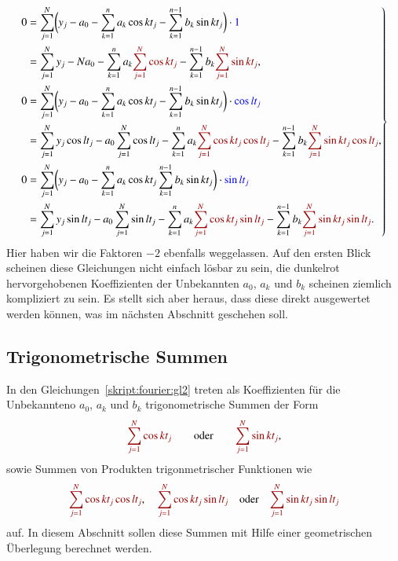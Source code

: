 \begin{equation}
\left.
\begin{aligned}
0&=
\sum_{j=1}^N
\biggl(
y_j - a_0 - \sum_{k=1}^n a_k\cos kt_j - \sum_{k=1}^{n-1} b_k\sin kt_j
\biggr)\cdot\mathstrut{\color{blue}1}
\\
&=
\sum_{j=1}^N y_j
-Na_0
-\sum_{k=1}^n a_k {\color{darkred}\sum_{j=1}^N\cos kt_j}
-\sum_{k=1}^{n-1} b_k {\color{darkred}\sum_{j=1}^N\sin kt_j},
\\
0&=
\sum_{j=1}^N
\biggl(
y_j - a_0 - \sum_{k=1}^n a_k\cos kt_j - \sum_{k=1}^{n-1} b_k\sin kt_j
\biggr)\cdot\mathstrut {\color{blue}\cos lt_j}
\\
&=
\sum_{j=1}^N y_j \cos lt_j
-a_0\sum_{j=1}^N \cos lt_j
-\sum_{k=1}^n a_k {\color{darkred}\sum_{j=1}^N\cos kt_j\cos lt_j}
-\sum_{k=1}^{n-1} b_k {\color{darkred}\sum_{j=1}^N\sin kt_j\cos lt_j},
\\
0
&=
\sum_{j=1}^N
\biggl(
y_j - a_0 - \sum_{k=1}^n a_k\cos kt_j \sum_{k=1}^{n-1} b_k\sin kt_j
\biggr)\cdot\mathstrut {\color{blue}\sin lt_j}
\\
&=
\sum_{j=1}^N y_j \sin lt_j
-a_0\sum_{j=1}^N \sin lt_j
-\sum_{k=1}^n a_k {\color{darkred}\sum_{j=1}^N\cos kt_j\sin lt_j}
-\sum_{k=1}^{n-1} b_k {\color{darkred}\sum_{j=1}^N\sin kt_j\sin lt_j}.
\end{aligned}
\right\}
\label{skript:fourier:gl2}
\end{equation}
Hier haben wir die Faktoren $-2$ ebenfalls weggelassen.
Auf den ersten Blick scheinen diese Gleichungen nicht einfach lösbar zu
sein, die {\color{darkred}dunkelrot} hervorgehobenen Koeffizienten der
Unbekannten $a_0$, $a_k$ und $b_k$ scheinen ziemlich kompliziert zu sein.
Es stellt sich aber heraus, dass diese direkt ausgewertet werden können,
was im nächsten Abschnitt geschehen soll.

\subsection{Trigonometrische Summen}
In den Gleichungen~\eqref{skript:fourier:gl2} treten als Koeffizienten
für die Unbekannteno $a_0$, $a_k$ und $b_k$ trigonometrische Summen
der Form
\begin{equation}
{\color{darkred}
\sum_{j=1}^N \cos kt_j}
\qquad
\text{oder}
\qquad
{\color{darkred}
\sum_{j=1}^N \sin kt_j},
\label{skript:fourier:trigosum}
\end{equation}
sowie Summen von Produkten trigonmetrischer Funktionen wie
\begin{equation}
{\color{darkred}\sum_{j=1}^N \cos kt_j\cos lt_j},\quad
{\color{darkred}\sum_{j=1}^N \cos kt_j\sin lt_j}
\quad
\text{oder}
\quad
{\color{darkred}\sum_{j=1}^N \sin kt_j\sin lt_j}
\label{fourier:produkte}
\end{equation}
auf.
In diesem Abschnitt sollen diese Summen mit Hilfe einer geometrischen
Überlegung berechnet werden.

